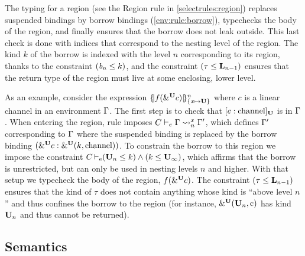 The typing for a region (see the {\sc Region} rule in \cref{selectrules:region})
replaces suspended bindings by borrow bindings
(\cref{env:rule:borrow}), typechecks the body
of the region, and finally ensures that the borrow does not leak outside.
This last check is done with indices that correspond to the nesting
level of the region. The kind $k$ of the borrow is indexed with the level $n$
corresponding to its region, thanks to the constraint $(\BORROW_n\lk
k)$, and the constraint $\Cleq{\tau}{\klin_{n-1}}$ ensures that
the return type of the region must live at some enclosing, lower level.

As an example, consider the expression $\region{\Sone x\IBORROW}{f(\borrow[\IBORROW]{c})}$
where $c$ is a linear channel in an environment $\E$.
The first step is to check that $\svar[\IBORROW]{c}{\text{channel}}$
is in $\E$.
When entering the region, rule  imposes
$\lregion{C}{x}{\E}{\E'}$, which defines $\E'$
corresponding to $\E$ where the suspended binding is replaced by the
borrow binding  $\bvar{\borrow[\IBORROW]{c}}{\borrowty[\IBORROW]{k}{\text{channel}}}$.
To constrain the borrow to this region we impose the constraint
$\entail{C}{(\kun_n\lk k) \wedge (k \lk\kun_\infty)}$, which affirms
that the borrow is unrestricted, but can only be used in nesting
levels $n$ and higher.
With that setup we typecheck the body of the region,
$f(\borrow[\IBORROW]{c})$.
The constraint $\Cleq{\tau}{\klin_{n-1}}$ ensures
that the kind of $\tau$ does not contain anything whose kind is
``above level $n$'' and thus confines the borrow to the region
(for instance, $\borrowty[\IBORROW]{\kun_n}{\text{c}}$ has kind
$\kun_n$ and thus cannot be returned).








\subsection{Semantics}
\label{sec:sem}



